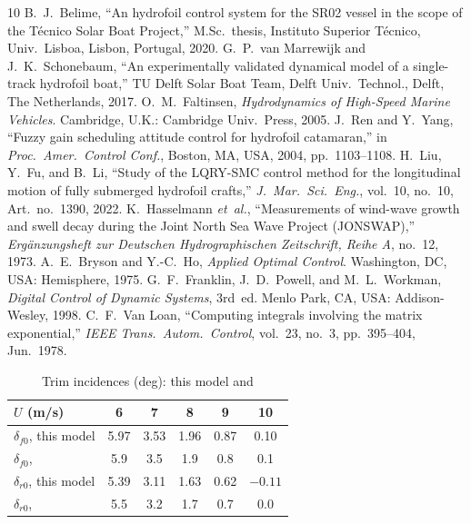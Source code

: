 \documentclass[conference]{IEEEtran}
\begin{document}
\begin{thebibliography}{10}
 B.~J.~Belime, ``An hydrofoil control system for the SR02
vessel in the scope of the T\'ecnico Solar Boat Project,'' M.Sc.\ thesis,
Instituto Superior T\'ecnico, Univ.\ Lisboa, Lisbon, Portugal, 2020.
 G.~P.~van Marrewijk and J.~K.~Schonebaum, ``An
experimentally validated dynamical model of a single-track hydrofoil boat,''
TU Delft Solar Boat Team, Delft Univ.\ Technol., Delft, The Netherlands, 2017.
 O.~M.~Faltinsen, \emph{Hydrodynamics of High-Speed Marine
Vehicles}. Cambridge, U.K.: Cambridge Univ.\ Press, 2005.
 J.~Ren and Y.~Yang, ``Fuzzy gain scheduling attitude control
for hydrofoil catamaran,'' in \emph{Proc.\ Amer.\ Control Conf.}, Boston, MA,
USA, 2004, pp.~1103--1108.
 H.~Liu, Y.~Fu, and B.~Li, ``Study of the LQRY-SMC control method
for the longitudinal motion of fully submerged hydrofoil crafts,'' \emph{J.\
Mar.\ Sci.\ Eng.}, vol.~10, no.~10, Art.\ no.~1390, 2022.
 K.~Hasselmann \emph{et~al.}, ``Measurements of wind-wave
growth and swell decay during the Joint North Sea Wave Project (JONSWAP),''
\emph{Erg\"anzungsheft zur Deutschen Hydrographischen Zeitschrift, Reihe A},
no.~12, 1973.
 A.~E.~Bryson and Y.-C.~Ho, \emph{Applied Optimal Control}.
Washington, DC, USA: Hemisphere, 1975.
 G.~F.~Franklin, J.~D.~Powell, and M.~L.~Workman,
\emph{Digital Control of Dynamic Systems}, 3rd~ed. Menlo Park, CA, USA:
Addison-Wesley, 1998.
 C.~F.~Van Loan, ``Computing integrals involving the matrix
exponential,'' \emph{IEEE Trans.\ Autom.\ Control}, vol.~23, no.~3,
pp.~395--404, Jun.\ 1978.
\end{thebibliography}


\begin{table}[h]
\centering
\caption{Trim incidences (deg): this model and \cite{belime}}
\label{tab:trim}
\small
\begin{tabular}{@{}lccccc@{}}
\toprule
$U$ (\si{m/s}) & 6 & 7 & 8 & 9 & 10 \\ \midrule
$\delta_{f0}$, this model & 5.97 & 3.53 & 1.96 & 0.87 & 0.10 \\
$\delta_{f0}$, \cite{belime} & 5.9 & 3.5 & 1.9 & 0.8 & 0.1 \\
$\delta_{r0}$, this model & 5.39 & 3.11 & 1.63 & 0.62 & $-0.11$ \\
$\delta_{r0}$, \cite{belime} & 5.5 & 3.2 & 1.7 & 0.7 & 0.0 \\
\bottomrule
\end{tabular}
\end{table}
\end{document}

